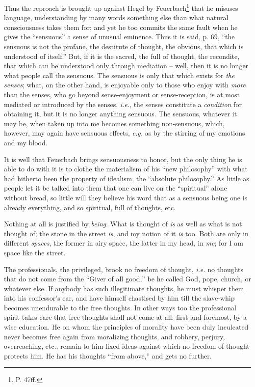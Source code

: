 Thus the reproach is brought up against Hegel by Feuerbach\footnote{P. 47ff.} 
that he misuses language, understanding by many words something else than what 
natural consciousness takes them for; and yet he too commits the same fault 
when he gives the ``sensuous'' a sense of unusual eminence. Thus it is said, 
p. 69, ``the sensuous is not the profane, the destitute of thought, the 
obvious, that which is understood of itself.'' But, if it is the sacred, the 
full of thought, the recondite, that which can be understood only through 
mediation -- well, then it is no longer what people call the sensuous. The 
sensuous is only that which exists for \textit{the senses}; what, on the other 
hand, is enjoyable only to those who enjoy with \textit{more} than the senses, 
who go beyond sense-enjoyment or sense-reception, is at most mediated or 
introduced by the senses, \textit{i.e.}, the senses constitute a 
\textit{condition} for obtaining it, but it is no longer anything sensuous. 
The sensuous, whatever it may be, when taken up into me becomes something 
non-sensuous, which, however, may again have sensuous effects, \textit{e.g.} 
as by the stirring of my emotions and my blood.

It is well that Feuerbach brings sensuousness to honor, but the only thing he 
is able to do with it is to clothe the materialism of his ``new philosophy'' 
with what had hitherto been the property of idealism, the ``absolute 
philosophy.'' As little as people let it be talked into them that one can 
live on the ``spiritual'' alone without bread, so little will they believe 
his word that as a sensuous being one is already everything, and so spiritual, 
full of thoughts, etc.

Nothing at all is justified by \textit{being}. What is thought of \textit{is} 
as well as what is not thought of; the stone in the street \textit{is}, and my 
notion of it \textit{is} too. Both are only in different \textit{spaces}, the 
former in airy space, the latter in my head, in \textit{me}; for I am space 
like the street.

The professionals, the privileged, brook no freedom of thought, \textit{i.e.} 
no thoughts that do not come from the ``Giver of all good,'' be he called 
God, pope, church, or whatever else. If anybody has such illegitimate 
thoughts, he must whisper them into his confessor's ear, and have himself 
chastised by him till the slave-whip becomes unendurable to the free thoughts. 
In other ways too the professional spirit takes care that free thoughts shall 
not come at all: first and foremost, by a wise education. He on whom the 
principles of morality have been duly inculcated never becomes free again from 
moralizing thoughts, and robbery, perjury, overreaching, etc., remain to him 
fixed ideas against which no freedom of thought protects him. He has his 
thoughts ``from above,'' and gets no further.

